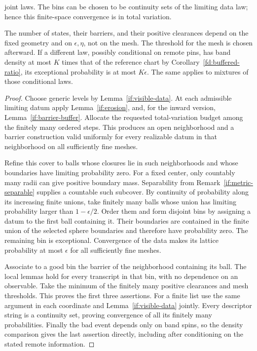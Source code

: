 \begin{theorem}
\begin{enumerate}
      joint laws.  The bins can be chosen to be continuity sets of
      the limiting data law; hence this finite-space convergence is
      in total variation.
\end{enumerate}
The number of states, their barriers, and their positive clearances
depend on the fixed geometry and on $\epsilon,\eta$, not on the mesh.
The threshold for the mesh is chosen afterward.  If a different law,
possibly conditional on remote pins, has band density at most $K$
times that of the reference chart by
Corollary~\ref{fd:buffered-ratio}, its exceptional probability is at most
$K\epsilon$.  The same applies to mixtures of those conditional laws.
\end{theorem}

\begin{proof}
Choose generic levels by Lemma~\ref{if:visible-data}.  At each admissible
limiting datum apply Lemma~\ref{if:erosion}, and, for the inward version,
Lemma~\ref{if:barrier-buffer}.  Allocate the requested total-variation
budget among the finitely many ordered steps.  This produces an open
neighborhood and a barrier construction valid uniformly for every
realizable datum in that neighborhood on all sufficiently fine meshes.

Refine this cover to balls whose closures lie in such neighborhoods
and whose boundaries have limiting probability zero.  For a fixed
center, only countably many radii can give positive boundary mass.
Separability from Remark~\ref{if:metric-separable} supplies a countable
such subcover. By continuity of probability along its increasing finite
unions, take finitely many balls whose union has limiting
probability larger than $1-\epsilon/2$.  Order them and form disjoint
bins by assigning a datum to the first ball containing it.  Their
boundaries are contained in the finite union of the selected sphere
boundaries and therefore have probability zero.  The remaining bin
is exceptional.  Convergence of the data makes its lattice probability
at most $\epsilon$ for all sufficiently fine meshes.

Associate to a good bin the barrier of the neighborhood containing
its ball.  The local lemmas hold for every transcript in that bin,
with no dependence on an observable.  Take the minimum of the
finitely many positive clearances and mesh thresholds.  This proves
the first three assertions.  For a finite list use the same argument
in each coordinate and Lemma~\ref{if:visible-data} jointly.  Every
descriptor string is a continuity set, proving convergence of all
its finitely many probabilities.  Finally the bad event depends
only on band spins, so the density comparison gives the last
assertion directly, including after conditioning on the stated
remote information.
\end{proof}

